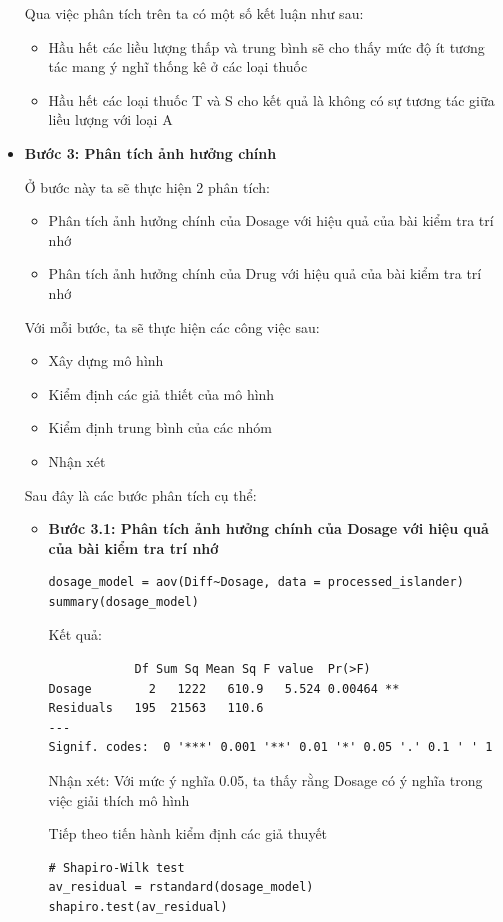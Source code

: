 \begin{itemize}
    Qua việc phân tích trên ta có một số kết luận như sau:
    \begin{itemize}
        \item Hầu hết các liều lượng thấp và trung bình sẽ cho thấy mức độ ít tương tác mang ý nghĩ thống kê ở các loại thuốc
        \item Hầu hết các loại thuốc T và S cho kết quả là không có sự tương tác giữa liều lượng với loại A
    \end{itemize}
    \item \textbf{Bước 3: Phân tích ảnh hưởng chính}

    Ở bước này ta sẽ thực hiện 2 phân tích:
    \begin{itemize}
        \item Phân tích ảnh hưởng chính của Dosage với hiệu quả của bài kiểm tra trí nhớ
        \item Phân tích ảnh hưởng chính của Drug với hiệu quả của bài kiểm tra trí nhớ
    \end{itemize}
    Với mỗi bước, ta sẽ thực hiện các công việc sau:
    \begin{itemize}
        \item Xây dựng mô hình
        \item Kiểm định các giả thiết của mô hình
        \item Kiểm định trung bình của các nhóm
        \item Nhận xét
    \end{itemize}
    Sau đây là các bước phân tích cụ thể:
    \begin{itemize}
        \item \textbf{Bước 3.1: Phân tích ảnh hưởng chính của Dosage với hiệu quả của bài kiểm tra trí nhớ}
        \begin{lstlisting}
dosage_model = aov(Diff~Dosage, data = processed_islander)
summary(dosage_model)
        \end{lstlisting}
        Kết quả:
        \begin{lstlisting}
            Df Sum Sq Mean Sq F value  Pr(>F)   
Dosage        2   1222   610.9   5.524 0.00464 **
Residuals   195  21563   110.6                   
---
Signif. codes:  0 '***' 0.001 '**' 0.01 '*' 0.05 '.' 0.1 ' ' 1
        \end{lstlisting}
        Nhận xét: Với mức ý nghĩa 0.05, ta thấy rằng Dosage có ý nghĩa trong việc giải thích mô hình

        Tiếp theo tiến hành kiểm định các giả thuyết
        \begin{lstlisting}
# Shapiro-Wilk test
av_residual = rstandard(dosage_model)
shapiro.test(av_residual)


\end{lstlisting}
\end{itemize}
\end{itemize}
